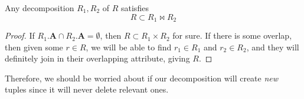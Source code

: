 \documentclass{article}
\begin{document}
    \begin{theorem}[Decomposition]
      Any decomposition $R_1, R_2$ of $R$ satisfies 
      \begin{equation}
        R \subset R_1 \bowtie R_2
      \end{equation}
    \end{theorem} 
    \begin{proof}
      If $R_1.\mathbf{A} \cap R_2.\mathbf{A} = \emptyset$, then $R \subset R_1 \times R_2$ for sure. If there is some overlap, then given some $r \in R$, we will be able to find $r_1 \in R_1$ and $r_2 \in R_2$, and they will definitely join in their overlapping attribute, giving $R$. 
    \end{proof}

    Therefore, we should be worried about if our decomposition will create \textit{new} tuples since it will never delete relevant ones.
\end{document}

